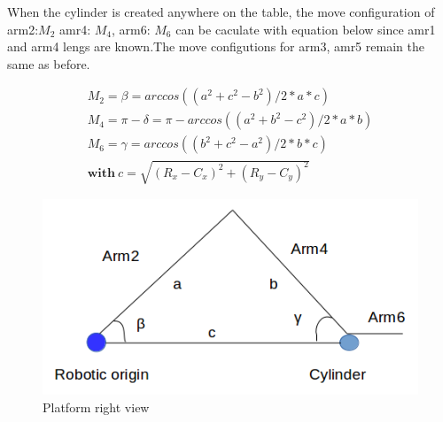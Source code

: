 When the cylinder is created anywhere on the table, the move configuration of arm2:$M_2$ amr4: $M_4$, arm6: $M_6$ can be caculate with equation below since amr1 and arm4 lengs are known.The move configutions for arm3, amr5 remain the same as before. 
 


\begin{equation}
\begin{aligned}
M_2=\beta=arccos((a^2+c^2-b^2)/2*a*c)\\
M_4=\pi-\delta=\pi-arccos((a^2+b^2-c^2)/2*a*b)\\
M_6=\gamma=arccos((b^2+c^2-a^2)/2*b*c)\\
\textbf{with}\ c=\sqrt{(R_x-C_x)^2+(R_y-C_y)^2}
\end{aligned}
\end{equation}

\begin{figure}[tpb]
\centering
	\includegraphics[width=0.96\linewidth]{figures/right_v.png} 
	\caption{Platform right view}
	\vspace{-0.4cm}
	\label{fig:right}
\end{figure}



